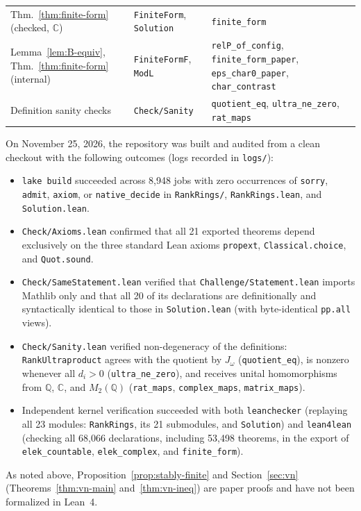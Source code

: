 \documentclass[11pt]{article}
\theoremstyle{definition}
\theoremstyle{remark}
\numberwithin{equation}{section}
\newcommand{\Q}{\mathbb{Q}}
\newcommand{\C}{\mathbb{C}}
\newcommand{\1}{\mathbf{1}}
\newcommand{\code}[1]{{\normalfont\small\texttt{#1}}}
\begin{document}
\begin{table}[ht]
\begin{tabular}{@{}ll>{\raggedright\arraybackslash}p{2.9in}@{}}
Thm.~\ref{thm:finite-form} (checked, $\C$) & \texttt{FiniteForm}, \texttt{Solution} & \texttt{finite\_form} \\
Lemma~\ref{lem:B-equiv}, Thm.~\ref{thm:finite-form} (internal) & \texttt{FiniteFormF}, \texttt{ModL} & \texttt{relP\_of\_config}, \texttt{finite\_form\_paper}, \texttt{eps\_char0\_paper}, \texttt{char\_contrast} \\
Definition sanity checks & \texttt{Check/Sanity} & \texttt{quotient\_eq}, \texttt{ultra\_ne\_zero}, \texttt{rat\_maps} \\
\bottomrule
\end{tabular}
\end{table}

On November 25, 2026, the repository was built and audited from a clean checkout with the following outcomes (logs recorded in \code{logs/}):
\begin{itemize}[leftmargin=1.8em]
\item \code{lake build} succeeded across 8,948 jobs with zero occurrences of \code{sorry}, \code{admit}, \code{axiom}, or \code{native\_decide} in \code{RankRings/}, \code{RankRings.lean}, and \code{Solution.lean}.
\item \code{Check/Axioms.lean} confirmed that all 21 exported theorems depend exclusively on the three standard Lean axioms \code{propext}, \code{Classical.choice}, and \code{Quot.sound}.
\item \code{Check/SameStatement.lean} verified that \code{Challenge/Statement.lean} imports Mathlib only and that all 20 of its declarations are definitionally and syntactically identical to those in \code{Solution.lean} (with byte-identical \code{pp.all} views).
\item \code{Check/Sanity.lean} verified non-degeneracy of the definitions: \code{RankUltraproduct} agrees with the quotient by $J_\omega$ (\code{quotient\_eq}), is nonzero whenever all $d_i > 0$ (\code{ultra\_ne\_zero}), and receives unital homomorphisms from $\Q$, $\C$, and $M_2(\Q)$ (\code{rat\_maps}, \code{complex\_maps}, \code{matrix\_maps}).
\item Independent kernel verification succeeded with both \code{leanchecker} (replaying all 23 modules: \code{RankRings}, its 21 submodules, and \code{Solution}) and \code{lean4lean} (checking all 68,066 declarations, including 53,498 theorems, in the export of \code{elek\_countable}, \code{elek\_complex}, and \code{finite\_form}).
\end{itemize}
As noted above, Proposition~\ref{prop:stably-finite} and Section~\ref{sec:vn} (Theorems~\ref{thm:vn-main} and~\ref{thm:vn-ineq}) are paper proofs and have not been formalized in Lean~4.
\end{document}

